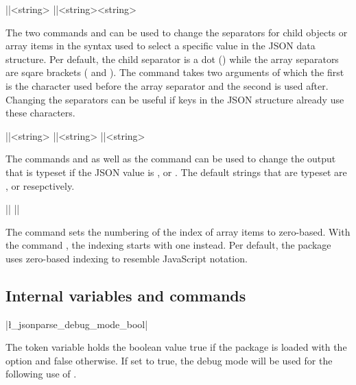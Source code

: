 \documentclass[a4paper]{article}
\begin{document}
\begin{macrodef}
|\JSONParseSetChildSeparator|{<string>}
|\JSONParseSetArraySeparator|{<string>}{<string>}
\end{macrodef}
The two commands \macro{\JSONParseSetChildSeparator} and \macro{\JSONParseSetArraySeparator} can be used to change the separators for child objects or array items in the syntax used to select a specific value in the JSON data structure. Per default, the child separator is a dot () while the array separators are sqare brackets (\macro{[} and \macro{]}). The command \macro{\JSONParseSetArraySeparator} takes two arguments of which the first is the character used before the array separator and the second is used after. Changing the separators can be useful if keys in the JSON structure already use these characters.

\begin{macrodef}
|\JSONParseSetTrueString|{<string>}
|\JSONParseSetFalseString|{<string>}
|\JSONParseSetNullString|{<string>}
\end{macrodef}
The commands \macro{\JSONParseSetTrueString} and \macro{\JSONParseSetFalseString} as well as the command \macro{\JSONParseSetNullString} can be used to change the output that is typeset if the JSON value is ,  or . The default strings that are typeset are ,  or  resepctively.

\begin{macrodef}
|\JSONParseSetArrayIndexZeroBased|
|\JSONParseSetArrayIndexOneBased|
\end{macrodef}
The command \macro{\JSONParseSetArrayIndexZeroBased} sets the numbering of the index of array items to zero-based. With the command \macro{\JSONParseSetArrayIndexOneBased}, the indexing starts with one instead. Per default, the package uses zero-based indexing to resemble JavaScript notation.

\subsection{Internal variables and commands}

\begin{macrodef}
|\l_jsonparse_debug_mode_bool|
\end{macrodef}
The token variable  holds the boolean value true if the package is loaded with the  option and false otherwise. If set to true, the debug mode will be used for the following use of . 
\end{document}
